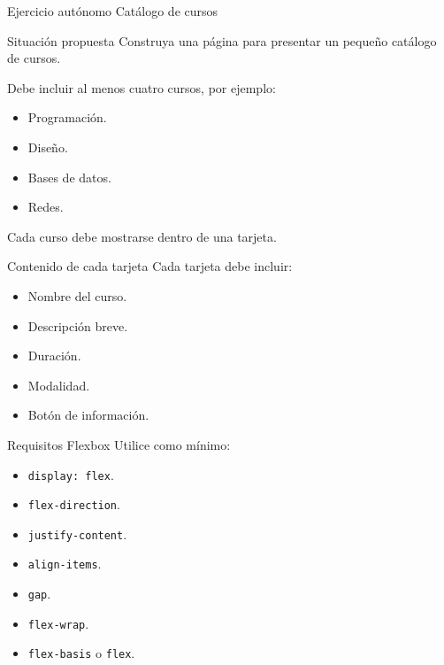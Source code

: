\documentclass[aspectratio=169,11.5pt]{beamer}
\begin{document}
    \SectionSlide
    {Ejercicio autónomo}
    {Catálogo de cursos}

    \begin{frame}{Situación propuesta}
        Construya una página para presentar
        un pequeño catálogo de cursos.

        Debe incluir al menos cuatro cursos,
        por ejemplo:

        \begin{itemize}
            \item Programación.
            \item Diseño.
            \item Bases de datos.
            \item Redes.
        \end{itemize}

        Cada curso debe mostrarse dentro
        de una tarjeta.
    \end{frame}

    \begin{frame}{Contenido de cada tarjeta}
        Cada tarjeta debe incluir:

        \begin{itemize}
            \item Nombre del curso.
            \item Descripción breve.
            \item Duración.
            \item Modalidad.
            \item Botón de información.
        \end{itemize}
    \end{frame}

    \begin{frame}{Requisitos Flexbox}
        Utilice como mínimo:

        \begin{itemize}
            \item \texttt{display: flex}.
            \item \texttt{flex-direction}.
            \item \texttt{justify-content}.
            \item \texttt{align-items}.
            \item \texttt{gap}.
            \item \texttt{flex-wrap}.
            \item \texttt{flex-basis} o \texttt{flex}.
        \end{itemize}
    \end{frame}
\end{document}
